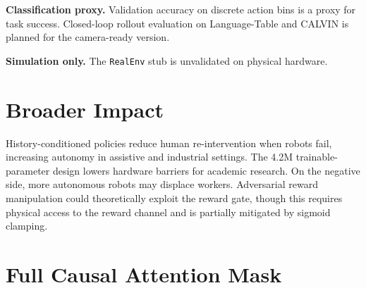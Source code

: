 \documentclass{article}
\begin{document}
\textbf{Classification proxy.}
Validation accuracy on discrete action bins is a proxy for task success.
Closed-loop rollout evaluation on Language-Table and CALVIN is planned for
the camera-ready version.

\textbf{Simulation only.}
The \texttt{RealEnv} stub is unvalidated on physical hardware.

\section*{Broader Impact}

History-conditioned policies reduce human re-intervention when robots fail,
increasing autonomy in assistive and industrial settings.
The 4.2M trainable-parameter design lowers hardware barriers for academic
research.
On the negative side, more autonomous robots may displace workers.
Adversarial reward manipulation could theoretically exploit the reward gate,
though this requires physical access to the reward channel and is partially
mitigated by sigmoid clamping.




\clearpage
\appendix

\section{Full Causal Attention Mask}
\label{app:mask}
\end{document}
